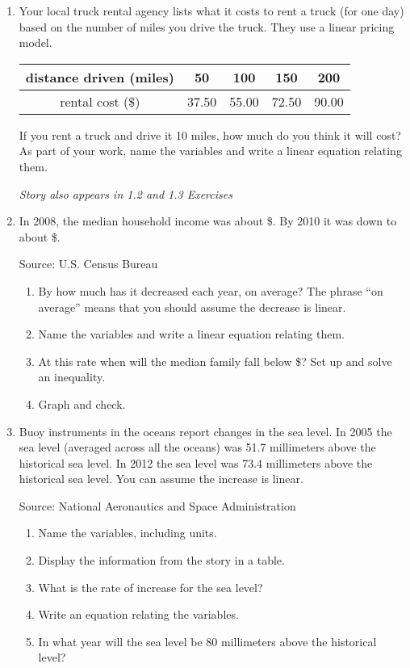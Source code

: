 \begin{enumerate}
\item Your local truck rental agency lists what it costs to rent a truck (for one day) based on the number of miles you drive the truck.  They use a linear pricing model.
\begin{center}
\begin{tabular} {|c| |c |c|c|c|} \hline
distance driven (miles) & 50 & 100 & 150 & 200 \\ \hline
rental cost (\$) & 37.50 & 55.00 & 72.50 & 90.00 \\ \hline
\end{tabular}
\end{center}
If you rent a truck and drive it 10 miles, how much do you think it will cost?  As part of your work, name the variables and write a linear equation relating them.

\hfill \emph{Story also appears in 1.2 and 1.3 Exercises}

\item In 2008, the median household income was about \$.  By 2010 it was down to about \$.
\hfill \begin{footnotesize} Source:  U.S. Census Bureau \end{footnotesize}
\begin{enumerate}
\item By how much has it decreased each year, on average? The phrase ``on average'' means that you should assume the decrease is linear.
\item Name the variables and write a linear equation relating them.
\item At this rate when will the median family fall below \$?  Set up and solve an inequality.
\item Graph and check.
\end{enumerate}

\item Buoy instruments in the oceans report changes in the sea level.  In 2005 the sea level (averaged across all the oceans) was 51.7 millimeters above the historical sea level.  In 2012 the sea level was 73.4 millimeters above the historical sea level.  You can assume the increase is linear.
\hfill \begin{footnotesize} Source:  National Aeronautics and Space Administration \end{footnotesize}
\begin{enumerate}
\item Name the variables, including units.
\item Display the information from the story in a table.
\item What is the rate of increase for the sea level?
\item Write an equation relating the variables.
\item In what year will the sea level be 80 millimeters above the historical level?
\end{enumerate} %

\end{enumerate}